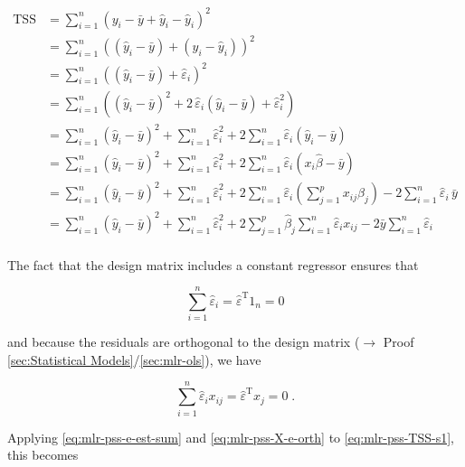 \documentclass[a4paper,12pt,twoside]{book}
\begin{document}
\begin{equation} \label{eq:mlr-pss-TSS-s1}
\begin{split}
\mathrm{TSS} &= \sum_{i=1}^{n} (y_i - \bar{y} + \hat{y}_i - \hat{y}_i)^2 \\
&= \sum_{i=1}^{n} \left( (\hat{y}_i - \bar{y}) + (y_i - \hat{y}_i) \right)^2 \\
&= \sum_{i=1}^{n} \left( (\hat{y}_i - \bar{y}) + \hat{\varepsilon}_i \right)^2 \\
&= \sum_{i=1}^{n} \left( (\hat{y}_i - \bar{y})^2 + 2 \, \hat{\varepsilon}_i (\hat{y}_i - \bar{y}) + \hat{\varepsilon}_i^2 \right) \\
&= \sum_{i=1}^{n} (\hat{y}_i - \bar{y})^2 + \sum_{i=1}^{n} \hat{\varepsilon}_i^2 + 2 \sum_{i=1}^{n} \hat{\varepsilon}_i (\hat{y}_i - \bar{y}) \\
&= \sum_{i=1}^{n} (\hat{y}_i - \bar{y})^2 + \sum_{i=1}^{n} \hat{\varepsilon}_i^2 + 2 \sum_{i=1}^{n} \hat{\varepsilon}_i (x_i \hat{\beta} - \bar{y}) \\
&= \sum_{i=1}^{n} (\hat{y}_i - \bar{y})^2 + \sum_{i=1}^{n} \hat{\varepsilon}_i^2 + 2 \sum_{i=1}^{n} \hat{\varepsilon}_i \left( \sum_{j=1}^{p} x_{ij} \hat{\beta}_j \right) - 2 \sum_{i=1}^{n} \hat{\varepsilon}_i \, \bar{y} \\
&= \sum_{i=1}^{n} (\hat{y}_i - \bar{y})^2 + \sum_{i=1}^{n} \hat{\varepsilon}_i^2 + 2 \sum_{j=1}^{p} \hat{\beta}_j \sum_{i=1}^{n} \hat{\varepsilon}_i x_{ij} - 2 \bar{y} \sum_{i=1}^{n} \hat{\varepsilon}_i \\
\end{split}
\end{equation}

The fact that the design matrix includes a constant regressor ensures that

\begin{equation} \label{eq:mlr-pss-e-est-sum}
\sum_{i=1}^{n} \hat{\varepsilon}_i = \hat{\varepsilon}^\mathrm{T} 1_n = 0
\end{equation}

and because the residuals are orthogonal to the design matrix ($\rightarrow$ Proof \ref{sec:Statistical Models}/\ref{sec:mlr-ols}), we have

\begin{equation} \label{eq:mlr-pss-X-e-orth}
\sum_{i=1}^{n} \hat{\varepsilon}_i x_{ij} = \hat{\varepsilon}^\mathrm{T} x_j = 0 \; .
\end{equation}

Applying \eqref{eq:mlr-pss-e-est-sum} and \eqref{eq:mlr-pss-X-e-orth} to \eqref{eq:mlr-pss-TSS-s1}, this becomes
\end{document}
